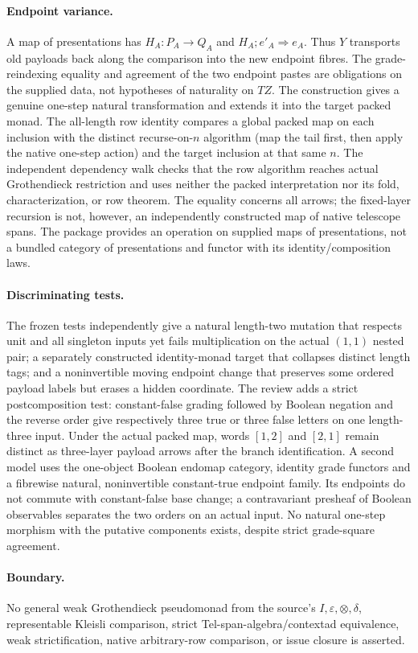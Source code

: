 \documentclass{article}
\begin{document}
\paragraph{Endpoint variance.} A map of presentations has $H_A:P_A\to Q_A$ and $H_A;e'_A\Rightarrow e_A$. Thus $Y$ transports old payloads back along the comparison into the new endpoint fibres. The grade-reindexing equality and agreement of the two endpoint pastes are obligations on the supplied data, not hypotheses of naturality on $TZ$. The construction gives a genuine one-step natural transformation and extends it into the target packed monad. The all-length row identity compares a global packed map on each inclusion with the distinct recurse-on-$n$ algorithm (map the tail first, then apply the native one-step action) and the target inclusion at that same $n$. The independent dependency walk checks that the row algorithm reaches actual Grothendieck restriction and uses neither the packed interpretation nor its fold, characterization, or row theorem. The equality concerns all arrows; the fixed-layer recursion is not, however, an independently constructed map of native telescope spans. The package provides an operation on supplied maps of presentations, not a bundled category of presentations and functor with its identity/composition laws.
\paragraph{Discriminating tests.} The frozen tests independently give a natural length-two mutation that respects unit and all singleton inputs yet fails multiplication on the actual $(1,1)$ nested pair; a separately constructed identity-monad target that collapses distinct length tags; and a noninvertible moving endpoint change that preserves some ordered payload labels but erases a hidden coordinate. The review adds a strict postcomposition test: constant-false grading followed by Boolean negation and the reverse order give respectively three true or three false letters on one length-three input. Under the actual packed map, words $[1,2]$ and $[2,1]$ remain distinct as three-layer payload arrows after the branch identification. A second model uses the one-object Boolean endomap category, identity grade functors and a fibrewise natural, noninvertible constant-true endpoint family. Its endpoints do not commute with constant-false base change; a contravariant presheaf of Boolean observables separates the two orders on an actual input. No natural one-step morphism with the putative components exists, despite strict grade-square agreement.
\paragraph{Boundary.} No general weak Grothendieck pseudomonad from the source's $I,\varepsilon,\otimes,\delta$, representable Kleisli comparison, strict Tel-span-algebra/contextad equivalence, weak strictification, native arbitrary-row comparison, or issue closure is asserted.
\end{document}
